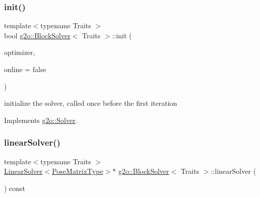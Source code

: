 \mbox{\label{classg2o_1_1_block_solver_a8bf01018abc3bfddfa3b29a380a1d6cb}} 
\subsubsection{\texorpdfstring{init()}{init()}}
{\footnotesize\ttfamily template$<$typename Traits $>$ \\
bool \mbox{\hyperlink{classg2o_1_1_block_solver}{g2o\+::\+Block\+Solver}}$<$ Traits $>$\+::init (\begin{DoxyParamCaption}\item[{\mbox{\hyperlink{classg2o_1_1_sparse_optimizer}{Sparse\+Optimizer}} $\ast$}]{optimizer,  }\item[{bool}]{online = {\ttfamily false} }\end{DoxyParamCaption})\hspace{0.3cm}{\ttfamily [virtual]}}

initialize the solver, called once before the first iteration 

Implements \mbox{\hyperlink{classg2o_1_1_solver_a532174e1ee53642880d2d59c128b037b}{g2o\+::\+Solver}}.

\mbox{\label{classg2o_1_1_block_solver_af71279eea2391daa4d7528da28107f1c}} 
\subsubsection{\texorpdfstring{linear\+Solver()}{linearSolver()}}
{\footnotesize\ttfamily template$<$typename Traits $>$ \\
\mbox{\hyperlink{classg2o_1_1_linear_solver}{Linear\+Solver}}$<$\mbox{\hyperlink{classg2o_1_1_block_solver_a8c7c43d361bd31e3e0353889ba703bc0}{Pose\+Matrix\+Type}}$>$$\ast$ \mbox{\hyperlink{classg2o_1_1_block_solver}{g2o\+::\+Block\+Solver}}$<$ Traits $>$\+::linear\+Solver (\begin{DoxyParamCaption}{ }\end{DoxyParamCaption}) const\hspace{0.3cm}{\ttfamily [inline]}}

\mbox{\label{classg2o_1_1_block_solver_a6eb8f0729e8bcd760e629421cfa7202c}} 
